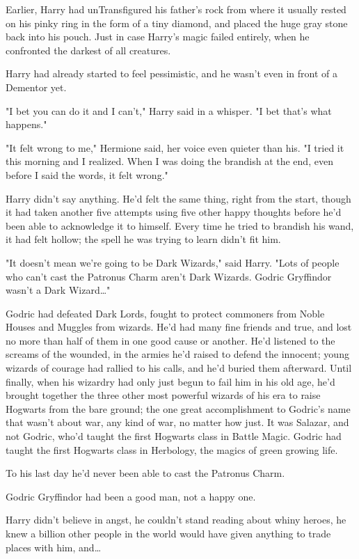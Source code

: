 Earlier, Harry had unTransfigured his father's rock from where it usually 
rested on his pinky ring in the form of a tiny diamond, and placed the huge 
gray stone back into his pouch. Just in case Harry's magic failed entirely, 
when he confronted the darkest of all creatures.

Harry had already started to feel pessimistic, and he wasn't even in front of a 
Dementor yet.

"I bet you can do it and I can't," Harry said in a whisper. "I bet that's what 
happens."

"It felt wrong to me," Hermione said, her voice even quieter than his. "I tried 
it this morning and I realized. When I was doing the brandish at the end, even 
before I said the words, it felt wrong."

Harry didn't say anything. He'd felt the same thing, right from the start, 
though it had taken another five attempts using five other happy thoughts 
before he'd been able to acknowledge it to himself. Every time he tried to 
brandish his wand, it had felt hollow; the spell he was trying to learn didn't 
fit him.

"It doesn't mean we're going to be Dark Wizards," said Harry. "Lots of people 
who can't cast the Patronus Charm aren't Dark Wizards. Godric Gryffindor wasn't 
a Dark Wizard{\ldots}"

Godric had defeated Dark Lords, fought to protect commoners from Noble Houses 
and Muggles from wizards. He'd had many fine friends and true, and lost no more 
than half of them in one good cause or another. He'd listened to the screams of 
the wounded, in the armies he'd raised to defend the innocent; young wizards of 
courage had rallied to his calls, and he'd buried them afterward. Until 
finally, when his wizardry had only just begun to fail him in his old age, he'd 
brought together the three other most powerful wizards of his era to raise 
Hogwarts from the bare ground; the one great accomplishment to Godric's name 
that wasn't about war, any kind of war, no matter how just. It was Salazar, and 
not Godric, who'd taught the first Hogwarts class in Battle Magic. Godric had 
taught the first Hogwarts class in Herbology, the magics of green growing life.

To his last day he'd never been able to cast the Patronus Charm.

Godric Gryffindor had been a good man, not a happy one.

Harry didn't believe in angst, he couldn't stand reading about whiny heroes, he 
knew a billion other people in the world would have given anything to trade 
places with him, and{\ldots}

